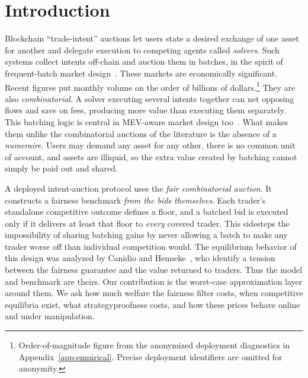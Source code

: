 \documentclass{llncs}
\begin{document}
\section{Introduction}\label{sec:intro}

Blockchain ``trade-intent'' auctions let users state a desired exchange
of one asset for another and delegate execution to competing agents
called \emph{solvers}. Such systems collect intents off-chain and
auction them in batches, in the spirit of frequent-batch market
design~\cite{budish2015}. These markets are economically significant.
Recent figures put monthly volume on the order of billions of
dollars.\footnote{Order-of-magnitude figure from the anonymized deployment
diagnostics in Appendix~\ref{app:empirical}. Precise deployment
identifiers are omitted for anonymity.} They are also \emph{combinatorial}.
A solver executing several intents together can net opposing flows and
save on fees, producing more value than executing them separately. This
batching logic is central in MEV-aware market design
too~\cite{canidio2023,daian2020}. What
makes them unlike the combinatorial auctions of the literature is the
absence of a \emph{numeraire}. Users may demand any asset for any other,
there is no common unit of account, and assets are illiquid, so the
extra value created by batching cannot simply be paid out and shared.

A deployed intent-auction protocol uses the \emph{fair combinatorial
auction}. It constructs a fairness benchmark \emph{from the
bids themselves}. Each trader's standalone competitive outcome defines a
floor, and a batched bid is executed only if it delivers at least that
floor to \emph{every} covered trader. This sidesteps the impossibility
of sharing batching gains by never allowing a batch to make any trader
worse off than individual competition would. The equilibrium behavior of
this design was analyzed by Canidio and Henneke~\cite{canidio2024}, who
identify a tension between the fairness guarantee and the value returned
to traders. Thus the model and benchmark are theirs. Our contribution is
the worst-case approximation layer around them. We ask how much welfare
the fairness filter costs, when competitive equilibria exist, what
strategyproofness costs, and how these prices behave online and under
manipulation.
\end{document}
